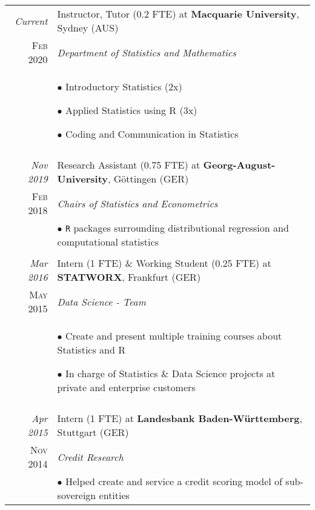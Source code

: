 \documentclass[a4paper,10pt]{article} %
\begin{document}
\begin{longtable}{r|p{10cm}}


  \emph{Current} & Instructor, Tutor (0.2 FTE) at \textbf{Macquarie University}, Sydney (AUS) \\
  \textsc{Feb 2020} & \emph{Department of Statistics and Mathematics}\\
  & \footnotesize{$\bullet$ Introductory Statistics (2x)


  $\bullet$ Applied Statistics using R (3x)
  

$\bullet$ Coding and Communication in Statistics} \\
  \multicolumn{2}{c}{} \\


  \emph{Nov 2019} & Research Assistant (0.75 FTE) at \textbf{Georg-August-University}, Göttingen (GER)\\
  \textsc{Feb 2018} & \emph{Chairs of Statistics and Econometrics}\\
  & \footnotesize{
  $\bullet$ \texttt{R} packages surrounding distributional regression and computational statistics}\\
  \multicolumn{2}{c}{} \\


\emph{Mar 2016} & Intern (1 FTE) \& Working Student (0.25 FTE) at \textbf{STATWORX}, Frankfurt (GER)\\
\textsc{May 2015} & \emph{Data Science - Team} \\
& \footnotesize{$\bullet$ Create and present multiple training courses about Statistics and R

$\bullet$ In charge of Statistics \& Data Science projects at private and enterprise customers}\\
\multicolumn{2}{c}{} \\


\newpage

\emph{Apr 2015} & Intern (1 FTE) at \textbf{Landesbank Baden-Württemberg}, Stuttgart (GER)\\
\textsc{Nov 2014} & \emph{Credit Research} \\
& \footnotesize{$\bullet$ Helped create and service a credit scoring model of sub-sovereign entities

}
\end{longtable}
\end{document}
